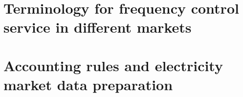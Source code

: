 \chapter{Terminology for frequency control service in different markets}
\label{app:terminology-frequency-control}

\chapter{Accounting rules and electricity market data preparation}
\label{sec:accounting-data-prepare}


